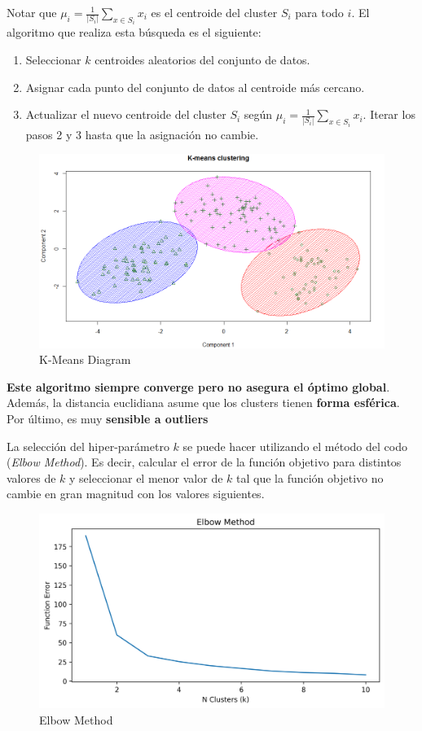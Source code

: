 Notar que $\mu_i = \frac{1}{|S_i|}\sum_{x \in S_i}x_i$ es el centroide del cluster $S_i$ para todo $i$. El algoritmo que realiza esta búsqueda es el siguiente: 
\begin{enumerate}
    \item Seleccionar $k$ centroides aleatorios del conjunto de datos. 
    \item Asignar cada punto del conjunto de datos al centroide más cercano. 
    \item Actualizar el nuevo centroide del cluster $S_i$ según $\mu_i = \frac{1}{|S_i|}\sum_{x \in S_i}x_i$. Iterar los pasos 2 y 3 hasta que la asignación no cambie.
\end{enumerate}

\begin{figure}[H]
    \center
    \includegraphics[scale=0.25]{notebooks/ML/img/k_means_diagram.png}
    \caption{K-Means Diagram}
\end{figure}

\textbf{Este algoritmo siempre converge pero no asegura el óptimo global}. Además, la distancia euclidiana asume que los clusters tienen \textbf{forma esférica}. Por último, es muy \textbf{sensible a outliers}

La selección del hiper-parámetro $k$ se puede hacer utilizando el método del codo (\textit{Elbow Method}). Es decir, calcular el error de la función objetivo para distintos valores de $k$ y seleccionar el menor valor de $k$ tal que la función objetivo no cambie en gran magnitud con los valores siguientes. 

\begin{figure}[H]
    \center
    \includegraphics[scale=0.45]{notebooks/ML/img/elbow_method_k_means.png}
    \caption{Elbow Method}
\end{figure}

